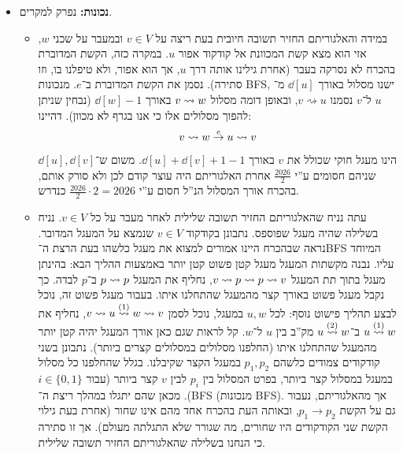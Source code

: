 \documentclass[]{../../../../tex/classes/homework}
\begin{document}
\begin{itemize}
		\item \textbf{נכונות: }נפרק למקרים. 
		\begin{itemize}
			\item במידה והאלגוריתם החזיר תשובה חיובית בעת ריצה על $v \in V$ ובמעבר על שכני $w$, אזי הוא מצא קשת המכוונת אל קודקוד אפור $u$. במקרה כזה, הקשת המדוברת בהכרח לא נסרקה בעבר (אחרת גילינו אותה דרך $u$, אך הוא אפור, ולא טיפלנו בו, וזו סתירה). נסמן את הקשת המדוברת ב־$e$. מנכונות BFS, ישנו מסלול באורך $\dd[u]$ מ־$u$ ל־$v$ נסמנו $v \rightsquigarrow u$, ובאופן דומה מסלול $v \rightsquigarrow w$ באורך $\dd[w] - 1$ (נבחין שניתן להפוך מסלולים אלו כי אנו בגרף לא מכוון). דהיינו: 
			\[ v \rightsquigarrow w \overset{e}{\to} u \rightsquigarrow v \]
			הינו מעגל חוקי שכולל את $v$ באורך $\dd[u] + \dd[v] + 1 - 1$. משום ש־$\dd[u], \dd[v]$ שניהם חסומים ע''י $\frac{2026}{2}$ אחרת האלגוריתם היה עוצר קודם לכן ולא סורק אותם, בהכרח אורך המסלול הנ''ל חסום ע''י $\frac{2026}{2} \cdot 2 = 2026$ כנדרש. 
			\item עתה נניח שהאלגוריתם החזיר תשובה שלילית לאחר מעבר על כל $v \in V$. נניח בשלילה שהיה מעגל שפוספס. נתבונן בקודקוד $v \in V$ שנמצא על המעגל המדובר. נראה שבהכרח היינו אמורים למצוא את מעגל כלשהו בעת הרצת ה־BFS המיוחד עליו. נבנה מקשתות המעגל מעגל קטן פשוט קטן יותר באמצעות ההליך הבא: בהינתן מעגל בתוך תת המעגל $v \rightsquigarrow p \rightsquigarrow p \rightsquigarrow v$, נחליף את המעגל $p \rightsquigarrow p$ ב־$p$ לבדה. כך נקבל מעגל פשוט באורך קצר מהמעגל שהתחלנו איתו. בעבור מעגל פשוט זה, נוכל לבצע תהליך פישוט נוסף: לכל $u, w$ במעגל, נוכל לסמן $v \rightsquigarrow u \overset{(1)}{\rightsquigarrow} w \rightsquigarrow v$, נחליף את $u \overset{(1)}{\rightsquigarrow} w$ ב־$u \overset{(2)}{\rightsquigarrow} w$ מק''ב בין $u$ ל־$w$. קל לראות שגם כאן אורך המעגל יהיה קטן יותר מהמעגל שהתחלנו איתו (החלפנו מסלולים במסלולים קצרים ביותר). נתבונן בשני קודקודים צמודים כלשהם $p_1, p_2$ במעגל הקצר שקיבלנו. בגלל שהחלפנו כל מסלול במעגל במסלול קצר ביותר, בפרט המסלול בין $p_i$ לבין $v$ קצר ביותר (עבור $i \in \{0, 1\}$). מכאן שהם יתגלו במהלך ריצת ה־BFS (מנכונות BFS). אך מהאלגוריתם, נעבור גם על הקשת $p_1 \to p_2$, ובאותה העת בהכרח אחד מהם אינו שחור (אחרת בעת גילוי הקשת שני הקודקודים היו שחורים, מה שגורר שלא התגלתה מעולם). אך זו סתירה כי הנחנו בשלילה שהאלגוריתם החזיר תשובה שלילית. 
		\end{itemize}
	\end{itemize}
	
	
	\npage
	\section{}
	
\end{document}

